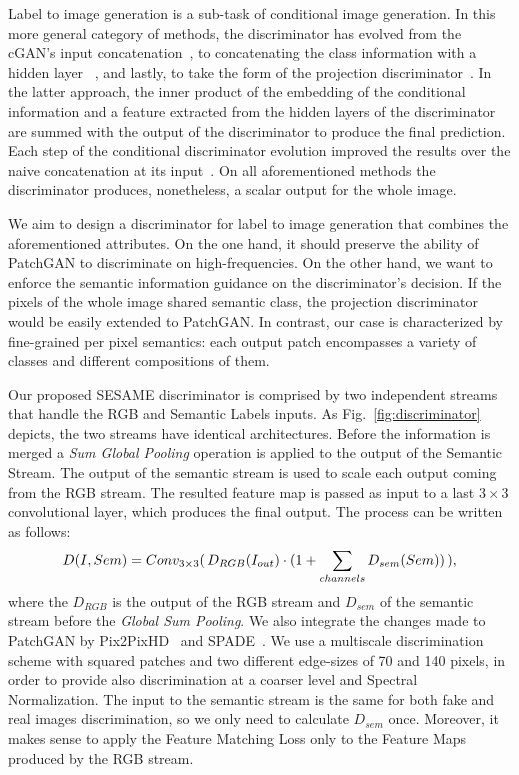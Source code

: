 \documentclass[runningheads]{llncs}
\newcommand{\fref}[1]{Fig.~\ref{#1}}
\begin{document}
Label to image generation is a sub-task of conditional image generation. In this more general category of methods, the discriminator has evolved from the cGAN's input concatenation~\cite{mirza2014conditional}, to concatenating the class information with a hidden layer ~\cite{reed2016generative}, and lastly, to take the form of the projection discriminator~\cite{miyato2018cgans}. In the latter approach, the inner product of the embedding of the conditional information and a feature extracted from the hidden layers of the discriminator are summed with the output of the discriminator to produce the final prediction. Each step of the conditional discriminator evolution improved the results over the naive concatenation at its input~\cite{miyato2018cgans}. On all aforementioned methods the discriminator produces, nonetheless, a scalar output for the whole image.

We aim to design a discriminator for label to image generation that combines the aforementioned attributes. On the one hand, it should preserve the ability of PatchGAN to discriminate on high-frequencies. On the other hand, we want to enforce the semantic information guidance on the discriminator's decision. If the pixels of the whole image shared semantic class, the projection discriminator would be easily extended to PatchGAN. In contrast, our case is characterized by fine-grained per pixel semantics: each output patch encompasses a variety of classes and different compositions of them.

Our proposed SESAME discriminator is comprised by two independent streams that handle the RGB and Semantic Labels inputs.
As \fref{fig:discriminator} depicts, the two streams have identical architectures. 
Before the information is merged a \textit{Sum Global Pooling} operation is applied to the output of the Semantic Stream.
The output of the semantic stream is used to scale each output coming from the RGB stream.
The resulted feature map is passed as input to a last $3\times3$ convolutional layer, which produces the final output.
The process can be written as follows:
\begin{equation}
   D(I,Sem) = {Conv_{3\times3}}( \thinspace D_{RGB}(I_{out}) \cdot(1 + \sum_{channels}{D_{sem}(Sem)}) \thinspace ),
\end{equation}\label{eq:scale}
where the $D_{RGB}$ is the output of the RGB stream and $D_{sem}$ of the semantic stream before the \textit{Global Sum Pooling}.
We also integrate the changes made to PatchGAN by Pix2PixHD~\cite{wang2018pix2pixHD} and SPADE~\cite{park2019SPADE}.
We use a multiscale discrimination scheme with squared patches and two different edge-sizes of 70 and 140 pixels, in order to provide also discrimination at a coarser level and Spectral Normalization. 
The input to the semantic stream is the same for both fake and real images discrimination, so we only need to calculate $D_{sem}$ once. 
Moreover, it makes sense to apply the Feature Matching Loss only to the Feature Maps produced by the RGB stream.
\end{document}
